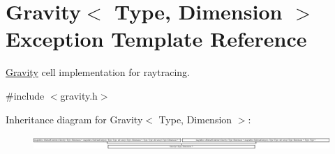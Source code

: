 \hypertarget{exceptionGravity}{\section{Gravity$<$ Type, Dimension $>$ Exception Template Reference}
\label{exceptionGravity}
}


\hyperlink{exceptionGravity}{Gravity} cell implementation for raytracing.  




{\ttfamily \#include $<$gravity.\-h$>$}

Inheritance diagram for Gravity$<$ Type, Dimension $>$\-:\begin{figure}[H]
\begin{center}
\leavevmode
\includegraphics[height=0.534351cm]{exceptionGravity}
\end{center}
\end{figure}
